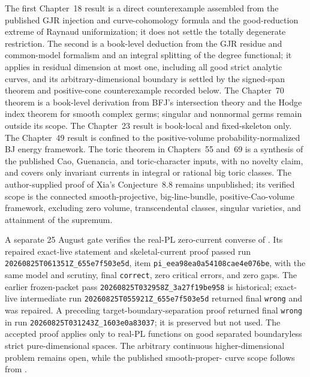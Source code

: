 The first Chapter~18 result is a direct counterexample assembled from the published
GJR injection and curve-cohomology formula and the good-reduction extreme of
Raynaud uniformization; it does not settle the totally degenerate restriction.
The second is a book-level deduction from the GJR residue and common-model
formalism and an integral splitting of the degree functional; it applies in
residual dimension at most one, including all good strict analytic curves,
and its arbitrary-dimensional boundary is settled by the signed-span theorem
and positive-cone counterexample recorded below.  The Chapter~70 theorem is a
book-level derivation from BFJ's intersection theory and the Hodge index
theorem for smooth complex germs; singular and nonnormal germs remain outside
its scope.
The Chapter~23 result is book-local and fixed-skeleton only.  The Chapter~49
result is confined to the positive-volume probability-normalized BJ energy
framework.  The toric theorem in Chapters~55 and~69 is a synthesis of the
published Cao, Guenancia, and toric-character inputs, with no novelty claim,
and covers only invariant currents in integral or rational big toric classes.
The author-supplied proof of Xia's Conjecture~8.8 remains unpublished; its
verified scope is the connected smooth-projective, big-line-bundle,
positive-Cao-volume framework, excluding zero volume, transcendental classes,
singular varieties, and attainment of the supremum.

A separate 25 August gate verifies the real-PL zero-current converse of
.  Its repaired exact-live
statement and skeletal-current proof passed run
\nolinkurl{20260825T061351Z_655e7f503e5d}, item
\nolinkurl{pi_eea98ea0a54108cae4e076be}, with the same model and scrutiny,
final \texttt{correct}, zero critical errors, and zero gaps.  The earlier
frozen-packet pass \nolinkurl{20260825T032958Z_3a27f19be958} is historical;
exact-live intermediate run \nolinkurl{20260825T055921Z_655e7f503e5d}
returned final \texttt{wrong} and was repaired.  A preceding
target-boundary-separation proof returned final \texttt{wrong} in run
\nolinkurl{20260825T031243Z_1603e0a83037}; it is preserved but not used.
The accepted proof applies only to real-PL functions on good separated
boundaryless strict pure-dimensional spaces.  The arbitrary continuous
higher-dimensional problem remains open, while the published smooth-proper-
curve scope follows from .

